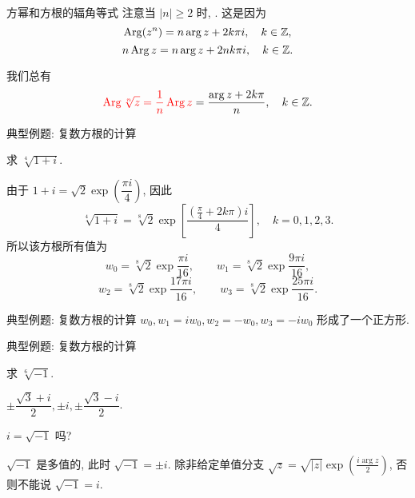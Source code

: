 \begin{frame}{方幂和方根的辐角等式}
\onslide<+->
注意当 $|n|\ge 2$ 时, .
\onslide<+->
这是因为
\[\operatorname{Arg}(z^n)=n\arg z+2k\pi i,\quad k\in{\mathbb{Z}},\]
\[n\operatorname{Arg} z=n\arg z+2nk\pi i,\quad k\in{\mathbb{Z}}.\]

\onslide<+->
我们总有
\[{\color{red}{\operatorname{Arg}\sqrt[n]z=\dfrac1n\operatorname{Arg}z}}=\dfrac{\arg z+2k\pi}n,\quad k\in{\mathbb{Z}}.\]
\end{frame}

\begin{frame}{典型例题: 复数方根的计算}
\beqskip{6pt}
\begin{example}
求 $\sqrt[4]{1+i}$.
\end{example}
\begin{solution}
由于 $1+i=\sqrt2\exp\left(\dfrac{\pi i}4\right)$,
\onslide<+->
因此
\[\sqrt[4]{1+i}=\sqrt[8]2\exp\left[\frac{(\frac\pi4+2k\pi)i}4\right],\quad k=0,1,2,3.\]
\onslide<+->
所以该方根所有值为
\[w_0=\sqrt[8]2\exp\frac{\pi i}{16},\qquad
w_1=\sqrt[8]2\exp\frac{9\pi i}{16},\]
\[w_2=\sqrt[8]2\exp\frac{17\pi i}{16},\qquad
w_3=\sqrt[8]2\exp\frac{25\pi i}{16}.\]
\end{solution}
\endgroup
\end{frame}


\begin{frame}{典型例题: 复数方根的计算}
\onslide<+->
$w_0,w_1=iw_0,w_2=-w_0,w_3=-iw_0$ 形成了一个正方形.
\onslide<+->
\begin{center}
\end{center}
\end{frame}


\begin{frame}{典型例题: 复数方根的计算}
\begin{exercise}
求 $\sqrt[6]{-1}$.
\end{exercise}
\begin{answer}
$\pm\dfrac{\sqrt3+i}2,\pm i,\pm\dfrac{\sqrt3-i}2$.
\end{answer}

\begin{think}
$i=\sqrt{-1}$ 吗?
\end{think}
\begin{answer}
$\sqrt{-1}$ 是多值的, 此时 $\sqrt{-1}=\pm i$.
\onslide<+->
除非给定单值分支 $\sqrt z=\sqrt{|z|}\exp\left(\frac{i\arg z}2\right)$, 否则不能说 $\sqrt{-1}=i$.
\end{answer}
\end{frame}


